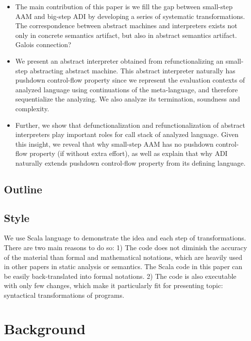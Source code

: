\documentclass[acmsmall,review,anonymous]{acmart}\settopmatter{printfolios=true,printccs=false,printacmref=false}
\begin{document}
\begin{itemize}
\item The main contribution of this paper is we fill the gap
  between small-step AAM and big-step ADI by developing a series of
  systematic transformations. The correspondence between abstract
  machines and interpreters exists not only in concrete semantics artifact,
  but also in abstract semantics artifact.
  Galois connection?

\item We present an abstract interpreter obtained from refunctionalizing
  an small-step abstracting abstract machine. 
  This abstract interpreter naturally has pushdown control-flow property
  since we represent the evaluation contexts of analyzed language using
  continuations of the meta-language, and therefore sequentialize the
  analyzing.
  We also analyze its termination, soundness and complexity.

\item Further, we show that defunctionalization and refunctionalization
  of abstract interpreters play important roles for call stack of analyzed language.
  Given this insight, we reveal that why small-step AAM has no pushdown
  control-flow property (if without extra effort), as well as explain
  that why ADI naturally extends pushdown control-flow property from its
  defining language.

\end{itemize}

\subsection{Outline}

\subsection{Style}

We use Scala language to demonstrate the idea and each step of transformations.
There are two main reasons to do so:
1) The code does not diminish the accuracy of the material
than formal and mathematical notations, 
which are heavily used in other papers in static analysis or semantics.
The Scala code in this paper can be easily back-translated into formal notations.
2) The code is also executable with only few changes, which make it particularly fit for 
presenting topic: syntactical transformations of programs.

\section{Background}
\end{document}
